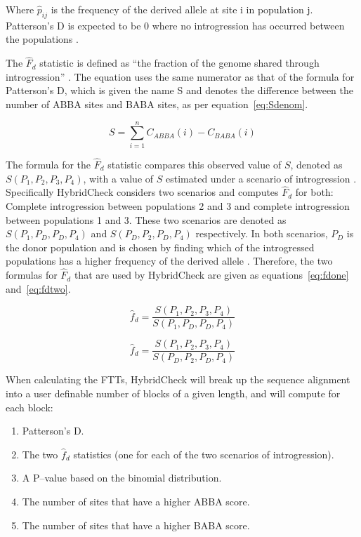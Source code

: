 Where $\hat{p}_{ij}$ is the frequency of the derived allele at site i in population j. Patterson’s D is expected to be 0 where no introgression has occurred between the populations \parencite{Durand2011}.

The $\hat{F}_d$ statistic is defined as “the fraction of the genome shared through introgression” \parencite{SMartin2014}. The equation uses the same numerator as that of the formula for Patterson’s D, which is given the name S and denotes the difference between the number of ABBA sites and BABA sites, as per equation~\ref{eq:Sdenom}.

\begin{equation}
	\label{eq:Sdenom}
	S = \sum_{i=1}^{n} C_{ABBA}(i) - C_{BABA}(i) 
\end{equation}

The formula for the $\hat{F}_d$ statistic compares this observed value of $S$, denoted as $S(P_1,P_2,P_3,P_4)$, with a value of $S$ estimated under a scenario of introgression \parencite{SMartin2014}. Specifically HybridCheck considers two scenarios and computes $\hat{F}_d$ for both: Complete introgression between populations 2 and 3 and complete introgression between populations 1 and 3. These two scenarios are denoted as $S(P_1,P_D,P_D,P_4)$ and $S(P_D,P_2,P_D,P_4)$ respectively. In both scenarios, $P_D$ is the donor population and is chosen by finding which of the introgressed populations has a higher frequency of the derived allele \parencite{SMartin2014}. Therefore, the two formulas for $\hat{F}_d$ that are used by HybridCheck are given as equations~\ref{eq:fdone} and~\ref{eq:fdtwo}.

\begin{equation}
	\label{eq:fdone}
	\hat{f}_d = \frac{S(P_1,P_2,P_3,P_4)}{S(P_1,P_D,P_D,P_4)}
\end{equation}

\begin{equation}
	\label{eq:fdtwo}
	\hat{f}_d = \frac{S(P_1,P_2,P_3,P_4)}{S(P_D,P_2,P_D,P_4)}
\end{equation}

When calculating the FTTs, HybridCheck will break up the sequence alignment into a user definable number of blocks of a given length, and will compute for each block:

\begin{enumerate}
	\item Patterson’s D.
    \item The two $\hat{f}_d$ statistics (one for each of the two scenarios of introgression).
    \item A P–value based on the binomial distribution.
    \item The number of sites that have a higher ABBA score.
    \item The number of sites that have a higher BABA score.
\end{enumerate}

